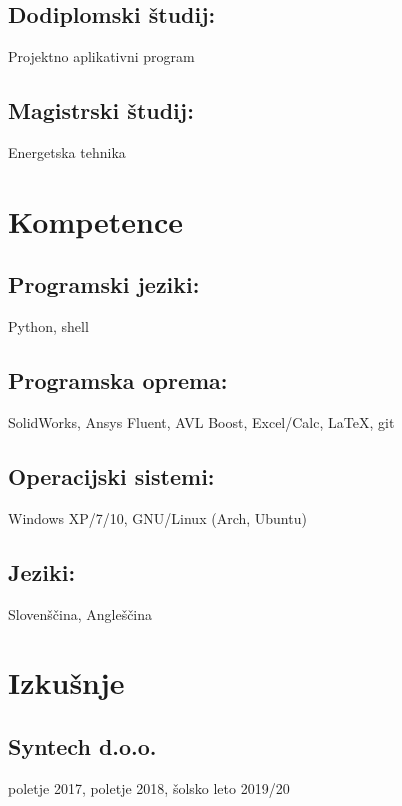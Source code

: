 \documentclass{article}
\begin{document}
\subsection{Dodiplomski študij:}

\hfill Projektno aplikativni program

\subsection{Magistrski študij:}

\hfill Energetska tehnika

\section{Kompetence}

\subsection{Programski jeziki:}
 
\hfill
Python, shell

\subsection{Programska oprema:}

\hfill
SolidWorks, Ansys Fluent, AVL Boost, Excel/Calc, LaTeX, git

\subsection{Operacijski sistemi:}

\hfill
Windows XP/7/10, GNU/Linux (Arch, Ubuntu)

\subsection{Jeziki:}

\hfill
Slovenščina, Angleščina

\section{Izku\v snje}

\subsection{Syntech d.o.o.} \hfill {\scriptsize poletje 2017, poletje 2018, šolsko leto 2019/20}
\end{document}
